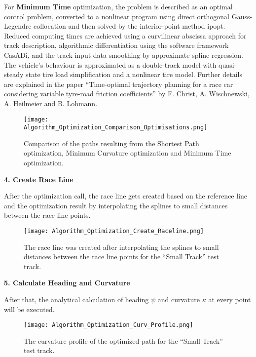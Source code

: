 For \textbf{Minimum Time} optimization, the problem is described as an optimal control problem, converted to a nonlinear program using direct orthogonal Gauss-Legendre collocation and then solved by the interior-point method \Gls{ipopt}. Reduced computing
times are achieved using a curvilinear \Gls{abscissa} approach for track description, algorithmic differentiation using the software framework CasADi, \cite{casadi} and the track input data smoothing by approximate spline regression. The vehicle's behaviour is approximated as a double-track model with quasi-steady state tire load simplification and a nonlinear tire model. Further details are explained in the paper ``Time-optimal trajectory planning for a race car considering variable tyre-road friction coefficients'' by F. Christ, A. Wischnewski, A. Heilmeier and B. Lohmann. \cite{minimum_time_trajectory_planning} \cite{powertrain_behaviour}

\begin{figure}[H]
    \centering
    \texttt{[image: Algorithm\_Optimization\_Comparison\_Optimisations.png]}
    \caption{Comparison of the paths resulting from the Shortest Path optimization, Minimum Curvature optimization and Minimum Time optimization. \cite{minimum_curvature_trajectory_planning}}
    \label{fig:Optimization Algorithm Comparing Different Optimisations}
\end{figure}

\pagebreak

\textbf{4. Create Race Line}

After the optimization call, the race line gets created based on the reference line and the optimization result by interpolating the splines to small distances between the race line points.
\begin{figure}[H]
    \centering
    \texttt{[image: Algorithm\_Optimization\_Create\_Raceline.png]}
    \caption{The race line was created after interpolating the splines to small distances between the race line points for the ``Small Track'' test track.}
    \label{fig:Optimization Algorithm Created Race Line}
\end{figure}

\textbf{5. Calculate Heading and Curvature}

After that, the analytical calculation of heading $\psi$ and curvature $\kappa$ at every point will be executed.
\begin{figure}[H]
    \centering
    \texttt{[image: Algorithm\_Optimization\_Curv\_Profile.png]}
    \caption{The curvature profile of the optimized path for the ``Small Track'' test track.}
    \label{fig:Optimization Algorithm Curvature Profile}
\end{figure}

